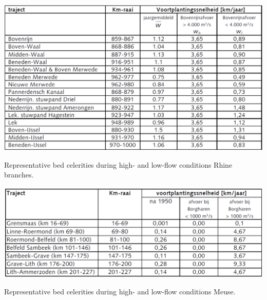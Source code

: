\begin{table}
\includegraphics[width=\columnwidth]{figures/Tab4_the2nd.png}
\caption{Representative bed celerities during high- and low-flow conditions Rhine branches.}
\label{Tab4RT}
\end{table}

\begin{table}
\includegraphics[width=\columnwidth]{figures/Tab5.png}
\caption{Representative bed celerities during high- and low-flow conditions Meuse.}
\label{Tab5}
\end{table}
